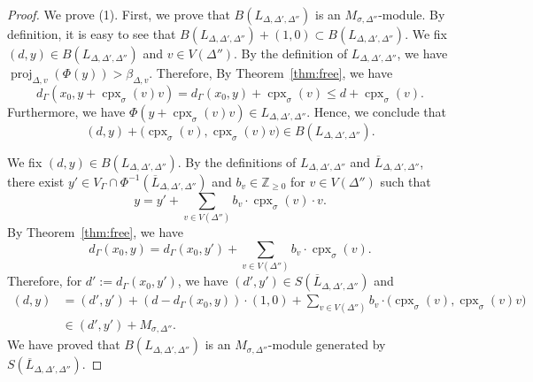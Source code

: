 \begin{proof}
We prove (1). First, we prove that $B \left( L_{\Delta, \Delta ', \Delta''} \right)$ is an  $M_{\sigma, \Delta ''}$-module. 
By definition, it is easy to see that $B \left( L_{\Delta, \Delta ', \Delta''} \right) + (1,0) \subset B \left( L_{\Delta, \Delta ', \Delta''} \right)$. 
We fix $(d, y) \in B \left( L_{\Delta, \Delta ', \Delta''} \right)$ and $v \in V(\Delta'')$. 
By the definition of $L_{\Delta, \Delta ', \Delta''}$, we have $\operatorname{proj}_{\Delta, v} (\Phi (y)) > \beta _{\Delta, v}$. 
Therefore, By Theorem~\ref{thm:free}, we have 
\[
d_{\Gamma}(x_0, y + \operatorname{cpx}_{\sigma}(v) v) 
= d_{\Gamma}(x_0, y) + \operatorname{cpx}_{\sigma}(v) 
\le d + \operatorname{cpx}_{\sigma}(v). 
\]
Furthermore, we have $\Phi (y + \operatorname{cpx}_{\sigma}(v) v) \in L_{\Delta, \Delta ', \Delta''}$. 
Hence, we conclude that 
\[
(d,y) + \bigl( \operatorname{cpx}_{\sigma}(v), \operatorname{cpx}_{\sigma}(v) v \bigr) \in B \left( L_{\Delta, \Delta ', \Delta''} \right). 
\]

We fix $(d, y) \in B \left( L_{\Delta, \Delta ', \Delta''} \right)$. 
By the definitions of $L_{\Delta, \Delta ', \Delta''}$ and $\overline{L}_{\Delta, \Delta ', \Delta''}$, 
there exist $y' \in V_{\Gamma} \cap \Phi^{-1} \left( \overline{L}_{\Delta, \Delta ', \Delta''} \right)$ and 
$b_v \in \mathbb{Z}_{\ge 0}$ for $v \in V(\Delta '')$ such that 
\[
y = y' + \sum _{v \in V(\Delta '')} b_v \cdot \operatorname{cpx}_{\sigma}(v) \cdot v. 
\]
By Theorem~\ref{thm:free}, we have 
\[
d_{\Gamma}(x_0, y) 
= d_{\Gamma}(x_0, y') + \sum _{v \in V(\Delta '')} b_v \cdot \operatorname{cpx}_{\sigma}(v).
\]
Therefore, for $d' := d_{\Gamma}(x_0, y')$, we have $(d', y') \in S \left(\overline{L}_{\Delta, \Delta ', \Delta''} \right)$ and 
\begin{align*}
(d,y) 
&= 
\left( d', y' \right) + \left( d-d_{\Gamma}(x_0, y) \right) \cdot (1, 0) 
+ \sum _{v \in V(\Delta '')} b_v \cdot \bigl( \operatorname{cpx}_{\sigma}(v), \operatorname{cpx}_{\sigma}(v) v \bigr) \\
&\in
\left( d', y' \right) + M_{\sigma, \Delta ''}. 
\end{align*}
We have proved that $B \left( L_{\Delta, \Delta ', \Delta''} \right)$ is an $M_{\sigma, \Delta ''}$-module generated by 
$S \left(\overline{L}_{\Delta, \Delta ', \Delta''} \right)$. 


\end{proof}
